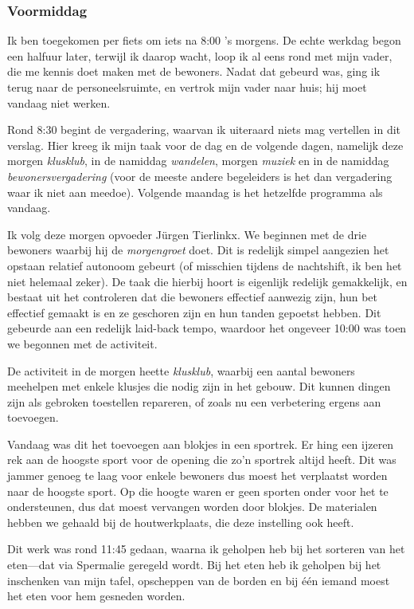 \documentclass[a4paper,12pt]{article}
\begin{document}
\subsubsection{Voormiddag}

Ik ben toegekomen per fiets om iets na 8:00 's morgens. De echte werkdag begon een halfuur later, terwijl ik daarop wacht, loop ik al eens rond met mijn vader, die me kennis doet maken met de bewoners. Nadat dat gebeurd was, ging ik terug naar de personeelsruimte, en vertrok mijn vader naar huis; hij moet vandaag niet werken.

Rond 8:30 begint de vergadering, waarvan ik uiteraard niets mag vertellen in dit verslag. Hier kreeg ik mijn taak voor de dag en de volgende dagen, namelijk deze morgen \emph{klusklub}, in de namiddag \emph{wandelen}, morgen \emph{muziek} en in de namiddag \emph{bewonersvergadering} (voor de meeste andere begeleiders is het dan vergadering waar ik niet aan meedoe). Volgende maandag is het hetzelfde programma als vandaag.

Ik volg deze morgen opvoeder Jürgen Tierlinkx. We beginnen met de drie bewoners waarbij hij de \emph{morgengroet} doet. Dit is redelijk simpel aangezien het opstaan relatief autonoom gebeurt (of misschien tijdens de nachtshift, ik ben het niet helemaal zeker). De taak die hierbij hoort is eigenlijk redelijk gemakkelijk, en bestaat uit het controleren dat die bewoners effectief aanwezig zijn, hun bet effectief gemaakt is en ze geschoren zijn en hun tanden gepoetst hebben. Dit gebeurde aan een redelijk laid-back tempo, waardoor het ongeveer 10:00 was toen we begonnen met de activiteit.

De activiteit in de morgen heette \emph{klusklub}, waarbij een aantal bewoners meehelpen met enkele klusjes die nodig zijn in het gebouw. Dit kunnen dingen zijn als gebroken toestellen repareren, of zoals nu een verbetering ergens aan toevoegen.

Vandaag was dit het toevoegen aan blokjes in een sportrek. Er hing een ijzeren rek aan de hoogste sport voor de opening die zo'n sportrek altijd heeft. Dit was jammer genoeg te laag voor enkele bewoners dus moest het verplaatst worden naar de hoogste sport. Op die hoogte waren er geen sporten onder voor het te ondersteunen, dus dat moest vervangen worden door blokjes. De materialen hebben we gehaald bij de houtwerkplaats, die deze instelling ook heeft.

Dit werk was rond 11:45 gedaan, waarna ik geholpen heb bij het sorteren van het eten---dat via Spermalie geregeld wordt. Bij het eten heb ik geholpen bij het inschenken van mijn tafel, opscheppen van de borden en bij één iemand moest het eten voor hem gesneden worden.
\end{document}
